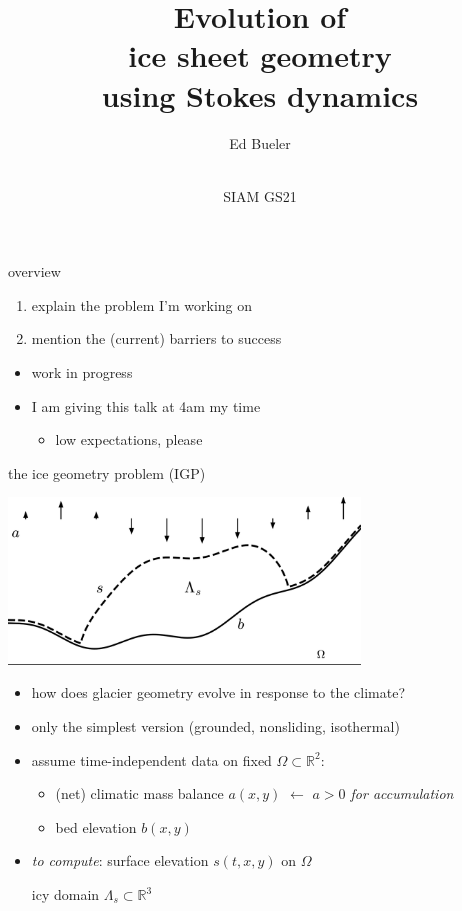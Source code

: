 \documentclass[usepdftitle=false,usenames,dvipsnames]{beamer}
\title{Evolution of \\ ice sheet geometry \\ using Stokes dynamics}
\author{Ed Bueler}
\date{\phantom{foo} \bigskip \bigskip \bigskip \\ SIAM GS21}
\newcommand{\RR}{\mathbb{R}}
\begin{document}
\begin{frame}
	\maketitle
\end{frame}


\begin{frame}{overview}
\Large
\begin{enumerate}
\item explain the problem I'm working on
\item mention the (current) barriers to success
\end{enumerate}

\normalsize
\vspace{10mm}
\begin{itemize}
\item work in progress
\item I am giving this talk at 4am my time
    \begin{itemize}
    \item low expectations, please
    \end{itemize}
\end{itemize}
\end{frame}


\begin{frame}{the ice geometry problem (IGP)}

\vspace{-2mm}
\begin{center}
\includegraphics[width=0.7\textwidth]{figs/stokesdomain.png}
\end{center}

\vspace{-1mm}
\begin{itemize}
\item how does glacier geometry evolve in response to the climate?
\item only the simplest version (grounded, nonsliding, isothermal)
\item assume time-independent data on fixed $\Omega \subset \RR^2$:
    \begin{itemize}
    \item (net) climatic mass balance $a(x,y)$ \hfill $\gets$ \emph{$a>0$ for accumulation}
    \item bed elevation $b(x,y)$
    \end{itemize}
\item \emph{to compute}: surface elevation $s(t,x,y)$ on $\Omega$

\hspace{20.5mm} icy domain $\Lambda_s \subset \RR^3$
\end{itemize}
\end{frame}
\end{document}
